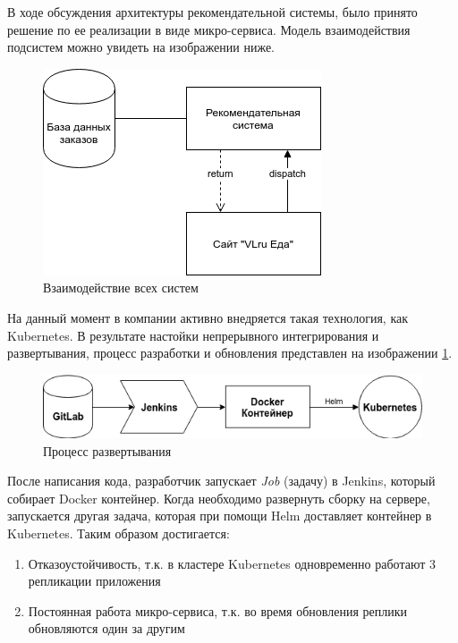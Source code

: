 В ходе обсуждения архитектуры рекомендательной системы, было принято решение по
ее реализации в виде микро-сервиса. Модель взаимодействия подсистем можно увидеть
на изображении ниже.
\begin{figure}[H]
  \centering
  \includegraphics[scale=0.8]{images/sub_modules.png}
  \caption{Взаимодействие всех систем}
\end{figure}
На данный момент в компании активно внедряется такая технология, как Kubernetes.
В результате настойки непрерывного интегрирования и развертывания, процесс
разработки и обновления представлен на изображении \ref{deploy}.
\begin{figure}[H]
  \label{deploy}
  \centering
  \includegraphics[scale=0.8]{images/deploy.png}
  \caption{Процесс развертывания}
\end{figure}
После написания кода, разработчик запускает \textit{Job} (задачу) в Jenkins, который
собирает Docker контейнер. Когда необходимо развернуть сборку на сервере, запускается
другая задача, которая при помощи Helm доставляет контейнер в Kubernetes. Таким
образом достигается:
\begin{enumerate}
  \item Отказоустойчивость, т.к. в кластере Kubernetes одновременно работают
  3 репликации приложения
  \item Постоянная работа микро-сервиса, т.к. во время обновления реплики обновляются
  один за другим
\end{enumerate}
